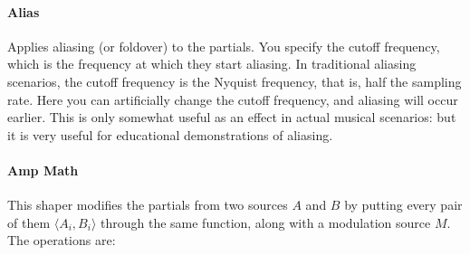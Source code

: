 \documentclass{article}
\begin{document}
\paragraph{Alias} Applies aliasing (or foldover) to the partials.  You specify the cutoff frequency, which is the frequency at which they start aliasing.  In traditional aliasing scenarios, the cutoff frequency is the Nyquist frequency, that is, half the sampling rate.  Here you can artificially change the cutoff frequency, and aliasing will occur earlier.  This is only somewhat useful as an effect in actual musical scenarios: but it is very useful for educational demonstrations of aliasing.

\paragraph{Amp Math}  This shaper modifies the partials from two sources \(A\) and \(B\) by putting every pair of them \(\langle A_i, B_i\rangle\) through the same function, along with a modulation source \(M\).  The operations are:
\end{document}
